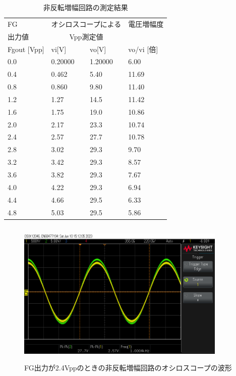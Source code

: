 \documentclass[a4j,10pt,dvipdfmx]{jarticle}
\begin{document}
\begin{table}[H]
  \begin{center}
  \begin{tabular}{|l|l|l|l|}
  \hline
      FG & \multicolumn{2}{|c|}{オシロスコープによる}  & 電圧増幅度 \\
      出力値 & \multicolumn{2}{|c|}{Vpp測定値}  & \\ \hline
      Fgout [Vpp] & vi[V] & vo[V] & vo/vi [倍] \\ \hline
      0.0  & 0.20000 & 1.20000 & 6.00 \\ \hline
      0.4  & 0.462  & 5.40  & 11.69 \\ \hline
      0.8  & 0.860  & 9.80  & 11.40 \\ \hline
      1.2  & 1.27  & 14.5  & 11.42 \\ \hline
      1.6  & 1.75  & 19.0  & 10.86 \\ \hline
      2.0  & 2.17  & 23.3  & 10.74 \\ \hline
      2.4  & 2.57  & 27.7  & 10.78 \\ \hline
      2.8  & 3.02  & 29.3  & 9.70 \\ \hline
      3.2  & 3.42  & 29.3  & 8.57 \\ \hline
      3.6  & 3.82  & 29.3  & 7.67 \\ \hline
      4.0  & 4.22  & 29.3  & 6.94 \\ \hline
      4.4  & 4.66  & 29.5  & 6.33 \\ \hline
      4.8  & 5.03  & 29.5  & 5.86 \\ \hline
  \end{tabular}
  \caption{非反転増幅回路の測定結果}
\end{center}
\end{table}
\begin{figure}[H]
  \begin{center}
  \includegraphics[height=7cm,width=10cm]{hihanten_2_4Vpp.png}
  \caption{FG出力が2.4Vppのときの非反転増幅回路のオシロスコープの波形}
\end{center}
\end{figure}
\end{document}
